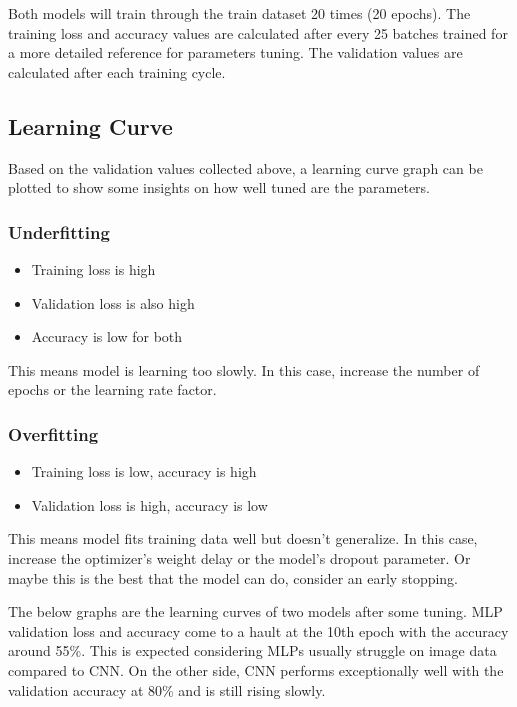 \documentclass{report}
\begin{document}
Both models will train through the train dataset 20 times (20 epochs). The training loss and accuracy values 
are calculated after every 25 batches trained for a more detailed reference for parameters tuning. The validation 
values are calculated after each training cycle.

\subsection{Learning Curve}
Based on the validation values collected above, a learning curve graph can be plotted to show some insights on 
how well tuned are the parameters.

\subsubsection*{Underfitting}
\begin{itemize}
    \item Training loss is high
    \item Validation loss is also high
    \item Accuracy is low for both
\end{itemize}
This means model is learning too slowly. In this case, increase the number of epochs or the learning rate factor.

\subsubsection*{Overfitting}
\begin{itemize}
    \item Training loss is low, accuracy is high
    \item Validation loss is high, accuracy is low
\end{itemize}
This means model fits training data well but doesn't generalize. In this case, increase the optimizer's weight
delay or the model's dropout parameter. Or maybe this is the best that the model can do, consider an early stopping.

\newpage
The below graphs are the learning curves of two models after some tuning. MLP validation loss and accuracy
come to a hault at the 10th epoch with the accuracy around 55\%. This is expected considering MLPs 
usually struggle on image data compared to CNN. On the other side, CNN performs exceptionally well with the
validation accuracy at 80\% and is still rising slowly. 
\end{document}
